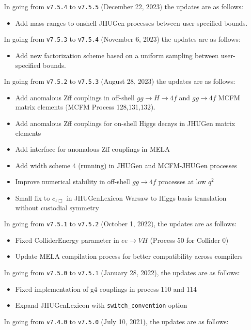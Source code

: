 \documentclass[aps,superscriptaddress,nofootinbib]{revtex4}
\begin{document}
\noindent 
In going from \verb|v7.5.4| to \verb|v7.5.5| (December 22, 2023) the updates are as follows:
\noindent
\begin{itemize}
\item Add mass ranges to onshell JHUGen processes between user-specified bounds.
\end{itemize}
\noindent 
In going from \verb|v7.5.3| to \verb|v7.5.4| (November 6, 2023) the updates are as follows:
\noindent
\begin{itemize}
\item Add new factorization scheme based on a uniform sampling between user-specified bounds.
\end{itemize}
\noindent 
In going from \verb|v7.5.2| to \verb|v7.5.3| (August 28, 2023) the updates are as follows:
\noindent
\begin{itemize}
\item Add anomalous Zff couplings in off-shell $gg\to H \to 4f$ and $gg \to 4f$ MCFM matrix elements (MCFM Process 128,131,132).
\item Add anomalous Zff couplings for on-shell Higgs decays in JHUGen matrix elements
\item Add interface for anomalous Zff couplings in MELA
\item Add width scheme 4 (running) in JHUGen and MCFM-JHUGen processes
\item Improve numerical stability in off-shell $gg \to 4f$ processes at low $q^2$ 
\item Small fix to $c_{z\Box}$ in JHUGenLexicon Warsaw to Higgs basis translation without custodial symmetry
\end{itemize}
\noindent 
In going from \verb|v7.5.1| to \verb|v7.5.2| (October 1, 2022), the updates are as follows:
\noindent
\begin{itemize}
\item Fixed ColliderEnergy parameter in $ee\to VH$ (Process 50 for Collider 0)
\item Update MELA compilation process for better compatibility across compilers
\end{itemize}
In going from \verb|v7.5.0| to \verb|v7.5.1| (January 28, 2022), the updates are as follows:
\noindent
\begin{itemize}
\item Fixed implementation of g4 couplings in process 110 and 114 
\item Expand JHUGenLexicon with \verb|switch_convention| option
\end{itemize}
In going from \verb|v7.4.0| to \verb|v7.5.0| (July 10, 2021), the updates are as follows:
\end{document}
